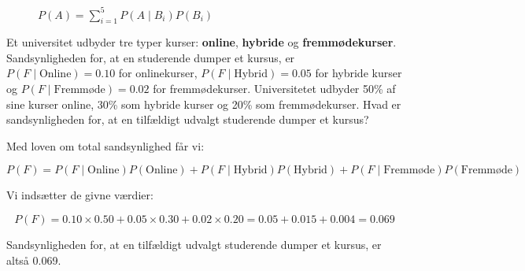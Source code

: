 \begin{figure}[htbp]
    \centering
    \caption{$P(A) = \sum_{i=1}^{5} P(A \mid B_i) P(B_i)$}
    \label{fig:decoAmulB}
\end{figure}

\begin{example}
    Et universitet udbyder tre typer kurser: \textbf{online}, \textbf{hybride} og \textbf{fremmødekurser}. Sandsynligheden for, at en studerende dumper et kursus, er \( P(F \mid \text{Online}) = 0.10 \) for onlinekurser, \( P(F \mid \text{Hybrid}) = 0.05 \) for hybride kurser og \( P(F \mid \text{Fremmøde}) = 0.02 \) for fremmødekurser. Universitetet udbyder 50\% af sine kurser online, 30\% som hybride kurser og 20\% som fremmødekurser. Hvad er sandsynligheden for, at en tilfældigt udvalgt studerende dumper et kursus?
\end{example}

\begin{solution}
    Med loven om total sandsynlighed får vi:

    \[
    P(F) = P(F \mid \text{Online}) P(\text{Online}) + P(F \mid \text{Hybrid}) P(\text{Hybrid}) + P(F \mid \text{Fremmøde}) P(\text{Fremmøde})
    \]

    Vi indsætter de givne værdier:

    \[
    P(F) = 0.10 \times 0.50 + 0.05 \times 0.30 + 0.02 \times 0.20 = 0.05 + 0.015 + 0.004 = 0.069
    \]

    Sandsynligheden for, at en tilfældigt udvalgt studerende dumper et kursus, er altså 0.069.
\end{solution}

